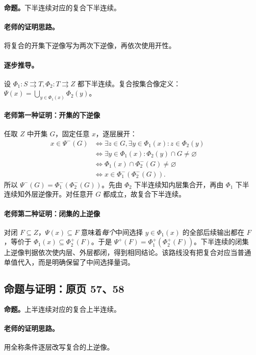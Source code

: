 \documentclass[11pt,a4paper]{article}
\theoremstyle{definition}\newtheorem{definition}{定义}\newtheorem{example}{例}
\begin{document}
\textbf{命题。}下半连续对应的复合下半连续。

\paragraph{老师的证明思路。}将复合的开集下逆像写为两次下逆像，再依次使用开性。

\paragraph{逐步推导。}
设 $\Phi_1:S\rightrightarrows T,\Phi_2:T\rightrightarrows Z$ 都下半连续。复合按集合像定义：$\Psi(x)=\bigcup_{y\in\Phi_1(x)}\Phi_2(y)$。
\paragraph{老师第一种证明：开集的下逆像}
任取 $Z$ 中开集 $G$，固定任意 $x$，逐层展开：
\begin{align*}
x\in\Psi^-(G)&\iff\exists z\in G,\exists y\in\Phi_1(x):z\in\Phi_2(y)\\
&\iff\exists y\in\Phi_1(x):\Phi_2(y)\cap G\ne\varnothing\\
&\iff\Phi_1(x)\cap\Phi_2^-(G)\ne\varnothing\\
&\iff x\in\Phi_1^-(\Phi_2^-(G)).
\end{align*}
所以 $\Psi^-(G)=\Phi_1^-(\Phi_2^-(G))$。先由 $\Phi_2$ 下半连续知内层集合开，再由 $\Phi_1$ 下半连续知外层逆像开。对任意开 $G$ 都成立，故复合下半连续。
\paragraph{老师第二种证明：闭集的上逆像}
对闭 $F\subseteq Z$，$\Psi(x)\subseteq F$ 意味着\emph{每个}中间选择 $y\in\Phi_1(x)$ 的全部后续输出都在 $F$，等价于 $\Phi_1(x)\subseteq\Phi_2^+(F)$。于是 $\Psi^+(F)=\Phi_1^+(\Phi_2^+(F))$。下半连续的闭集上逆像判据依次使内层、外层都闭，得到相同结论。该路线没有把复合对应当普通单值代入，而是明确保留了中间选择量词。


\subsection{命题与证明：原页 57、58}

\textbf{命题。}上半连续对应的复合上半连续。

\paragraph{老师的证明思路。}用全称条件逐层改写复合的上逆像。
\end{document}
